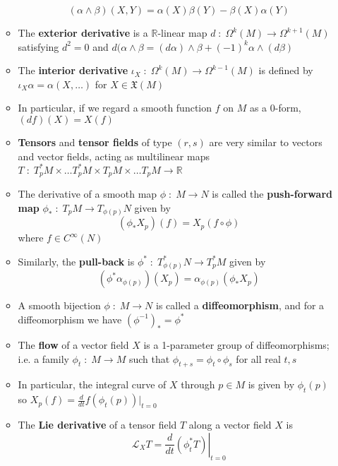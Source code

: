 \documentclass[12pt,a4paper]{article}
\numberwithin{equation}{section}
\begin{document}
\begin{itemize}
\begin{itemize}
			\begin{equation}
				(\alpha\wedge\beta)(X,Y)=\alpha(X)\beta(Y)-\beta(X)\alpha(Y)
			\end{equation}
			\item The \textbf{exterior derivative} is a $\mathbb{R}$-linear map $d\;:\;\Omega^{k}(M)\to\Omega^{k+1}(M)$ satisfying $d^{2}=0$ and $d(\alpha\wedge\beta=(d\alpha)\wedge\beta +(-1)^{k}\alpha\wedge(d\beta)$
			\item The \textbf{interior derivative} $\iota_{X}\;:\;\Omega^{k}(M)\to\Omega^{k-1}(M)$ is defined by $\iota_{X}\alpha=\alpha(X,\ldots)$ for $X\in\mathfrak{X}(M)$
			\item In particular, if we regard a smooth function $f$ on $M$ as a 0-form, $(df)(X)=X(f)$
			\item \textbf{Tensors} and \textbf{tensor fields} of type $(r,s)$ are very similar to vectors and vector fields, acting as multilinear maps $T\;:\; T_{p}^{*}M\times\ldots T_{p}^{*}M\times T_{p}M\times\ldots T_{p}M\to\mathbb{R}$
			\item The derivative of a smooth map $\phi\;:\;M\to N$ is called the \textbf{push-forward map} $\phi_{*}\;:\;T_{p}M\to T_{\phi(p)}N$ given by
			\begin{equation}
				(\phi_{*}X_{p})(f)=X_{p}(f\circ\phi)
			\end{equation} 
			where $f\in C^{\infty}(N)$
			\item Similarly, the \textbf{pull-back} is $\phi^{*}\;:\;T_{\phi(p)}^{*}N\to T_{p}^{*}M$ given by
			\begin{equation}
				(\phi^{*}\alpha_{\phi(p)})(X_{p})=\alpha_{\phi(p)}(\phi_{*}X_{p})
			\end{equation}
			\item A smooth bijection $\phi\;:\;M\to N$ is called a \textbf{diffeomorphism}, and for a diffeomorphism we have $(\phi^{-1})_{*}=\phi^{*}$
			\item The \textbf{flow} of a vector field $X$ is a 1-parameter group of diffeomorphisms; i.e. a family $\phi_{t}\;:\;M\to M$ such that $\phi_{t+s}=\phi_{t}\circ\phi_{s}$ for all real $t,s$
			\item In particular, the integral curve of $X$ through $p\in M$ is given by $\phi_{t}(p)$ so $X_{p}(f)=\frac{d}{dt}f(\phi_{t}(p))|_{t=0}$
			\item The \textbf{Lie derivative} of a tensor field $T$ along a vector field $X$ is
			\begin{equation}
				\mathcal{L}_{X}T=\left.\frac{d}{dt}(\phi_{t}^{*}T)\right|_{t=0}
			\end{equation}

\end{itemize}
\end{itemize}
\end{document}
